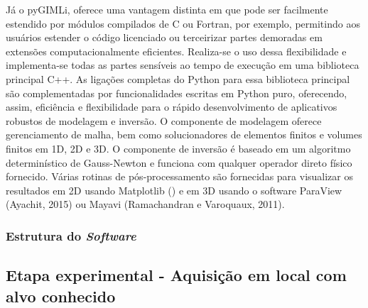 \documentclass[a4paper, 12 pt]{article} %
\begin{document}
Já o pyGIMLi, oferece uma vantagem distinta em que pode ser facilmente estendido por módulos compilados de C ou Fortran, por exemplo, permitindo aos usuários estender o código licenciado ou terceirizar partes demoradas em extensões computacionalmente eficientes. Realiza-se o uso dessa flexibilidade e implementa-se todas as partes sensíveis ao tempo de execução em uma biblioteca principal C++. As ligações completas do Python para essa biblioteca principal são complementadas por funcionalidades escritas em Python puro, oferecendo, assim, eficiência e flexibilidade para o rápido desenvolvimento de aplicativos robustos de modelagem e inversão. O componente de modelagem oferece gerenciamento de malha, bem como solucionadores de elementos finitos e volumes finitos em 1D, 2D e 3D. O componente de inversão é baseado em um algoritmo determinístico de Gauss-Newton e funciona com qualquer operador direto físico fornecido. Várias rotinas de pós-processamento são fornecidas para visualizar os resultados em 2D usando Matplotlib (\citealp{Ruecker2017}) e em 3D usando o software ParaView (Ayachit, 2015) ou Mayavi (Ramachandran e Varoquaux, 2011). 


\subsubsection{Estrutura do \emph{Software}}

\blindtext 
%
\blindtext 
%
\blindtext


\subsection{Etapa experimental - Aquisição em local com alvo conhecido}

\blindtext 
%
\blindtext 
%
\blindtext

\end{document}
